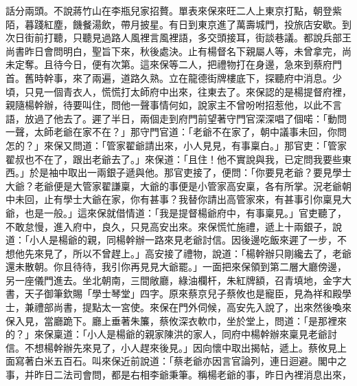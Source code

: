 \begin{showcontents}{}
話分兩頭。不說蔣竹山在李瓶兒家招贅。單表來保來旺二人上東京打點，朝登紫陌，暮踐紅塵，饑餐湯飲，帶月披星。有日到東京進了萬壽城門，投旅店安歇。到次日街前打聽，只聽見過路人風裡言風裡語，多交頭接耳，街談巷議。都說兵部王尚書昨日會問明白，聖旨下來，秋後處決。止有楊督名下親屬人等，未曾拿完，尚未定奪。且待今日，便有次第。這來保等二人，把禮物打在身邊，急來到蔡府門首。舊時幹事，來了兩遍，道路久熟。立在龍德街牌樓底下，探聽府中消息。少頃，只見一個青衣人，慌慌打太師府中出來，往東去了。來保認的是楊提督府裡，親隨楊幹辦，待要叫住，問他一聲事情何如，說家主不曾吩咐招惹他，以此不言語，放過了他去了。遲了半日，兩個走到府門前望著守門官深深唱了個喏：「動問一聲，太師老爺在家不在？」那守門官道：「老爺不在家了，朝中議事未回，你問怎的？」來保又問道：「管家翟爺請出來，小人見見，有事稟白。」那官吏：「管家翟叔也不在了，跟出老爺去了。」來保道：「且住！他不實說與我，已定問我要些東西。」於是袖中取出一兩銀子遞與他。那官吏接了，便問：「你要見老爺？要見學士大爺？老爺便是大管家翟謙稟，大爺的事便是小管家高安稟，各有所掌。況老爺朝中未回，止有學士大爺在家，你有甚事？我替你請出高管家來，有甚事引你稟見大爺，也是一般。」這來保就借情道：「我是提督楊爺府中，有事稟見。」官吏聽了，不敢怠慢，進入府中，良久，只見高安出來。來保慌忙施禮，遞上十兩銀子，說道：「小人是楊爺的親，同楊幹辦一路來見老爺討信。因後邊吃飯來遲了一步，不想他先來見了，所以不曾趕上。」高安接了禮物，說道：「楊幹辦只剛纔去了，老爺還未散朝。你且待待，我引你再見見大爺罷。」一面把來保領到第二層大廳傍邊，另一座儀門進去。坐北朝南，三間敞廳，綠油欄杆，朱紅牌額，召青填地，金字大書，天子御筆欽賜「學士琴堂」四字。原來蔡京兒子蔡攸也是寵臣，見為祥和殿學士，兼禮部尚書，提點太一宮使。來保在門外伺候，高安先入說了，出來然後喚來保入見，當廳跪下。廳上垂著朱簾，蔡攸深衣軟巾，坐於堂上，問道：「是那裡來的？」來保稟道：「小人是楊爺的親家陳洪的家人，同府中楊幹辦來稟見老爺討信。不想楊幹辦先來見了，小人趕來後見。」因向懷中取出揭帖，遞上。蔡攸見上面寫著白米五百石。叫來保近前說道：「蔡老爺亦因言官論列，連日迴避。閣中之事，并昨日二法司會問，都是右相李爺秉筆。稱楊老爺的事，昨日內裡消息出來， 
\end{showcontents}
